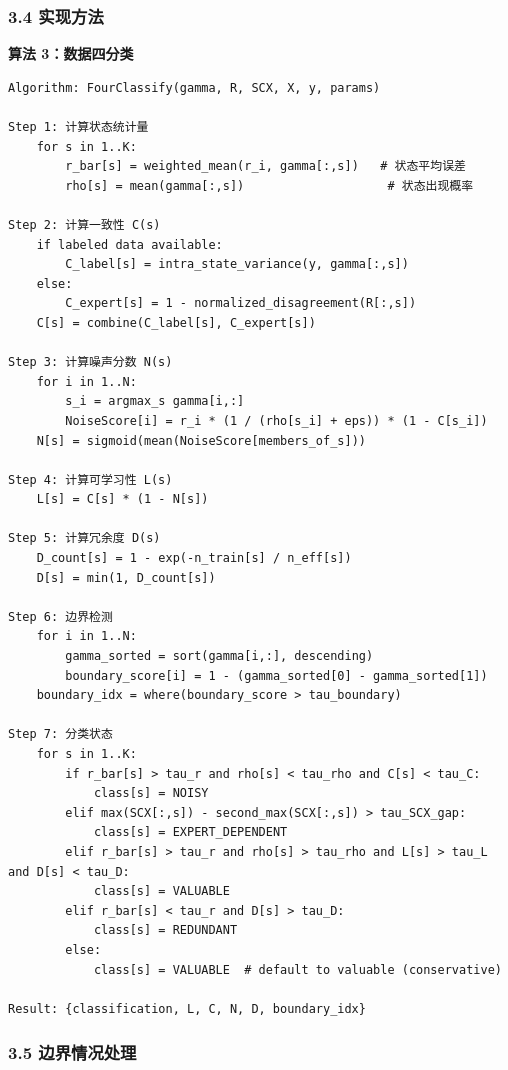 \documentclass[
  12pt,
]{ctexart}
\begin{document}
\subsubsection{3.4 实现方法}\label{ux5b9eux73b0ux65b9ux6cd5-2}

\textbf{算法 3：数据四分类}

\begin{verbatim}
Algorithm: FourClassify(gamma, R, SCX, X, y, params)

Step 1: 计算状态统计量
    for s in 1..K:
        r_bar[s] = weighted_mean(r_i, gamma[:,s])   # 状态平均误差
        rho[s] = mean(gamma[:,s])                    # 状态出现概率

Step 2: 计算一致性 C(s)
    if labeled data available:
        C_label[s] = intra_state_variance(y, gamma[:,s])
    else:
        C_expert[s] = 1 - normalized_disagreement(R[:,s])
    C[s] = combine(C_label[s], C_expert[s])

Step 3: 计算噪声分数 N(s)
    for i in 1..N:
        s_i = argmax_s gamma[i,:]
        NoiseScore[i] = r_i * (1 / (rho[s_i] + eps)) * (1 - C[s_i])
    N[s] = sigmoid(mean(NoiseScore[members_of_s]))

Step 4: 计算可学习性 L(s)
    L[s] = C[s] * (1 - N[s])

Step 5: 计算冗余度 D(s)
    D_count[s] = 1 - exp(-n_train[s] / n_eff[s])
    D[s] = min(1, D_count[s])

Step 6: 边界检测
    for i in 1..N:
        gamma_sorted = sort(gamma[i,:], descending)
        boundary_score[i] = 1 - (gamma_sorted[0] - gamma_sorted[1])
    boundary_idx = where(boundary_score > tau_boundary)

Step 7: 分类状态
    for s in 1..K:
        if r_bar[s] > tau_r and rho[s] < tau_rho and C[s] < tau_C:
            class[s] = NOISY
        elif max(SCX[:,s]) - second_max(SCX[:,s]) > tau_SCX_gap:
            class[s] = EXPERT_DEPENDENT
        elif r_bar[s] > tau_r and rho[s] > tau_rho and L[s] > tau_L and D[s] < tau_D:
            class[s] = VALUABLE
        elif r_bar[s] < tau_r and D[s] > tau_D:
            class[s] = REDUNDANT
        else:
            class[s] = VALUABLE  # default to valuable (conservative)

Result: {classification, L, C, N, D, boundary_idx}
\end{verbatim}

\subsubsection{3.5
边界情况处理}\label{ux8fb9ux754cux60c5ux51b5ux5904ux7406}
\end{document}
